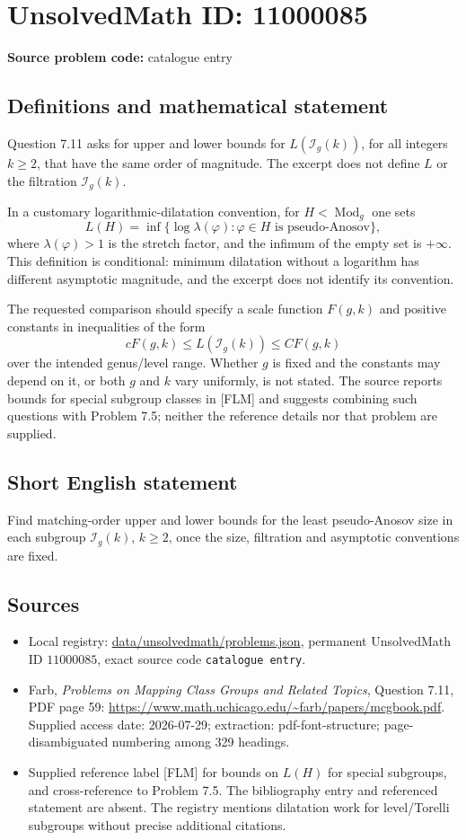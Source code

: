 \documentclass[11pt]{article}
\begin{document}
\section*{UnsolvedMath ID: 11000085}
\textbf{Source problem code:} catalogue entry
\subsection{Definitions and mathematical statement}
Question 7.11 asks for upper and lower bounds for $L(\mathcal I_g(k))$, for all integers $k\geq2$, that have the same order of magnitude. The excerpt does not define $L$ or the filtration $\mathcal I_g(k)$.

In a customary logarithmic-dilatation convention, for $H<\operatorname{Mod}_g$ one sets
\[
 L(H)=\inf\{\log\lambda(\varphi):\varphi\in H
 \text{ is pseudo-Anosov}\},
\]
where $\lambda(\varphi)>1$ is the stretch factor, and the infimum of the empty set is $+\infty$. This definition is conditional: minimum dilatation without a logarithm has different asymptotic magnitude, and the excerpt does not identify its convention.

The requested comparison should specify a scale function $F(g,k)$ and positive constants in inequalities of the form
\[
 cF(g,k)\leq L(\mathcal I_g(k))\leq CF(g,k)
\]
over the intended genus/level range. Whether $g$ is fixed and the constants may depend on it, or both $g$ and $k$ vary uniformly, is not stated. The source reports bounds for special subgroup classes in [FLM] and suggests combining such questions with Problem 7.5; neither the reference details nor that problem are supplied.
\subsection{Short English statement}
Find matching-order upper and lower bounds for the least pseudo-Anosov size in each subgroup $\mathcal I_g(k)$, $k\geq2$, once the size, filtration and asymptotic conventions are fixed.
\subsection{Sources}
\begin{itemize}
\item Local registry: \url{data/unsolvedmath/problems.json}, permanent UnsolvedMath ID $11000085$, exact source code \texttt{catalogue entry}.
\item Farb, \emph{Problems on Mapping Class Groups and Related Topics}, Question 7.11, PDF page 59: \url{https://www.math.uchicago.edu/~farb/papers/mcgbook.pdf}. Supplied access date: 2026-07-29; extraction: pdf-font-structure; page-disambiguated numbering among 329 headings.
\item Supplied reference label [FLM] for bounds on $L(H)$ for special subgroups, and cross-reference to Problem 7.5. The bibliography entry and referenced statement are absent. The registry mentions dilatation work for level/Torelli subgroups without precise additional citations.
\end{itemize}
\end{document}
